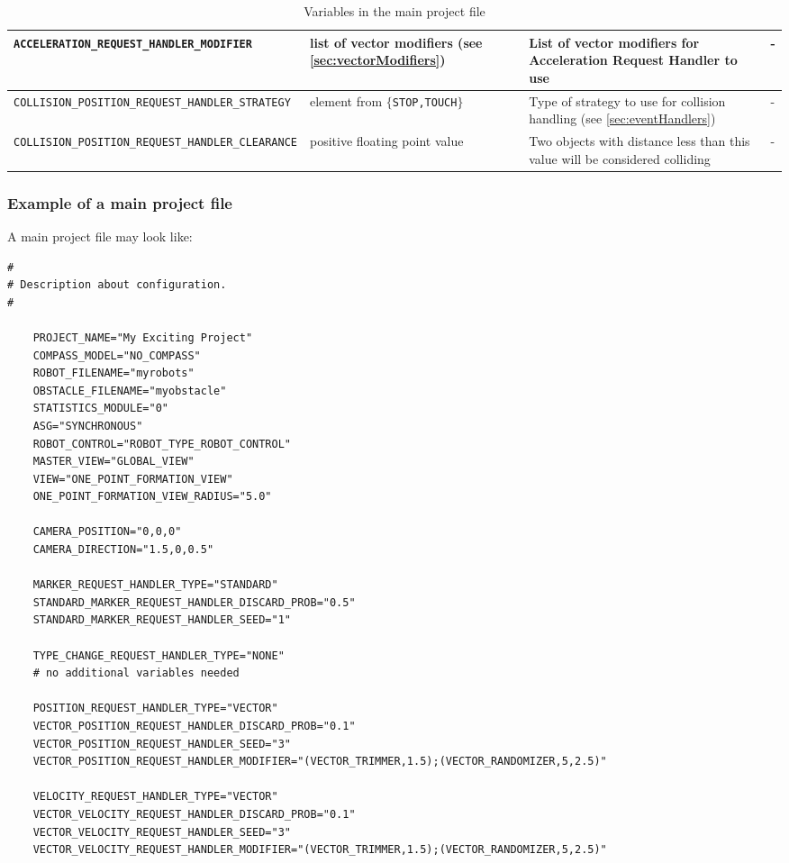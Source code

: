 \begin{sidewaystable}
\begin{tabular}{|l|p{}|p{}|p{}|}
		\texttt{ACCELERATION\_REQUEST\_HANDLER\_MODIFIER} & list of vector modifiers (see \ref{sec:vectorModifiers}) & List of vector modifiers for Acceleration Request Handler to use & -\\\hline
		
		\texttt{COLLISION\_POSITION\_REQUEST\_HANDLER\_STRATEGY} & element from $\{$\texttt{STOP,TOUCH}$\}$ & Type of strategy to use for collision handling (see \ref{sec:eventHandlers}) & -\\\hline
		
		\texttt{COLLISION\_POSITION\_REQUEST\_HANDLER\_CLEARANCE} & positive floating point value & Two objects with distance less than this value will be considered colliding & -\\\hline
				
	\end{tabular}
	\caption{Variables in the main project file}\label{tab:mainvars2}
\end{sidewaystable}
\enlargethispage*{2cm}
\thispagestyle{empty}
\clearpage


\subsubsection{Example of a main project file}
A main project file may look like:
\lstset{language=tcl}
\begin{lstlisting}
# 
# Description about configuration.
#
	
	PROJECT_NAME="My Exciting Project"
	COMPASS_MODEL="NO_COMPASS"
	ROBOT_FILENAME="myrobots"
	OBSTACLE_FILENAME="myobstacle"
	STATISTICS_MODULE="0"
	ASG="SYNCHRONOUS"
	ROBOT_CONTROL="ROBOT_TYPE_ROBOT_CONTROL"
	MASTER_VIEW="GLOBAL_VIEW"
	VIEW="ONE_POINT_FORMATION_VIEW"
	ONE_POINT_FORMATION_VIEW_RADIUS="5.0"
	
	CAMERA_POSITION="0,0,0"
	CAMERA_DIRECTION="1.5,0,0.5"
	
	MARKER_REQUEST_HANDLER_TYPE="STANDARD"
	STANDARD_MARKER_REQUEST_HANDLER_DISCARD_PROB="0.5"
	STANDARD_MARKER_REQUEST_HANDLER_SEED="1"

	TYPE_CHANGE_REQUEST_HANDLER_TYPE="NONE"
	# no additional variables needed

	POSITION_REQUEST_HANDLER_TYPE="VECTOR"
	VECTOR_POSITION_REQUEST_HANDLER_DISCARD_PROB="0.1"
	VECTOR_POSITION_REQUEST_HANDLER_SEED="3"
	VECTOR_POSITION_REQUEST_HANDLER_MODIFIER="(VECTOR_TRIMMER,1.5);(VECTOR_RANDOMIZER,5,2.5)"

	VELOCITY_REQUEST_HANDLER_TYPE="VECTOR"
	VECTOR_VELOCITY_REQUEST_HANDLER_DISCARD_PROB="0.1"
	VECTOR_VELOCITY_REQUEST_HANDLER_SEED="3"
	VECTOR_VELOCITY_REQUEST_HANDLER_MODIFIER="(VECTOR_TRIMMER,1.5);(VECTOR_RANDOMIZER,5,2.5)"
\end{lstlisting}


